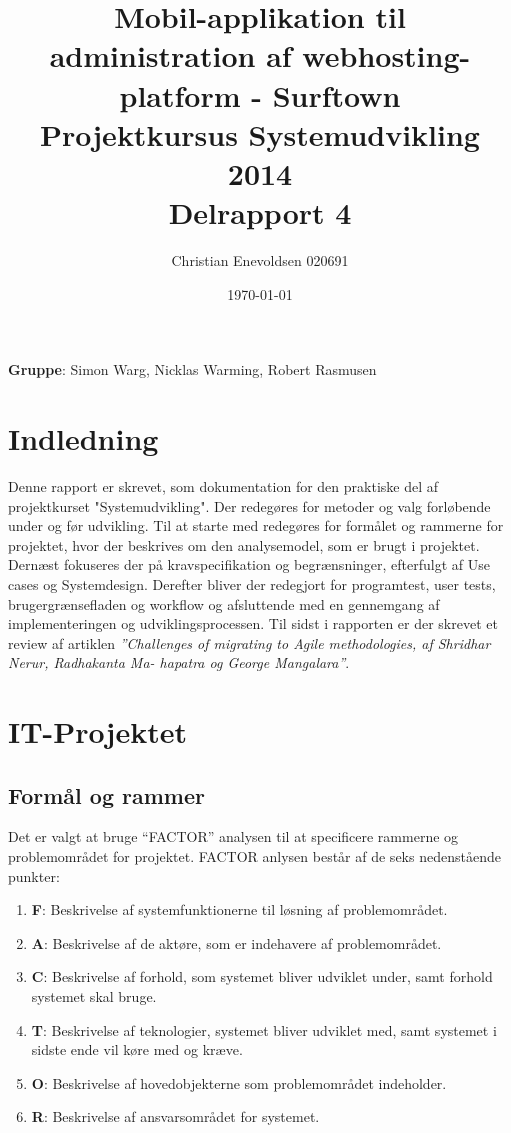 \documentclass[12pt]{article}
\title{Mobil-applikation til administration af webhosting-platform - Surftown\\Projektkursus Systemudvikling 2014\\Delrapport 4}
\date{\today}
\author{Christian Enevoldsen 020691}
\begin{document}
\maketitle
\begin{center}
  \textbf{Gruppe}: Simon Warg, Nicklas Warming, Robert Rasmusen
\end{center}
\newpage
\tableofcontents
\newpage
\section*{Indledning}

Denne rapport er skrevet, som dokumentation for den praktiske del af projektkurset "Systemudvikling". Der redegøres for metoder og valg forløbende under og før udvikling. Til at starte med redegøres for formålet og rammerne for projektet, hvor der beskrives om den analysemodel, som er brugt i projektet. Dernæst fokuseres der på kravspecifikation og begrænsninger, efterfulgt af Use cases og Systemdesign. Derefter bliver der redegjort for programtest, user tests, brugergrænsefladen og workflow og afsluttende med en gennemgang af implementeringen og udviklingsprocessen. Til sidst i rapporten er der skrevet et review af artiklen \emph{''Challenges of migrating to Agile methodologies, af Shridhar Nerur, Radhakanta Ma- hapatra og George Mangalara''}. 

\section {IT-Projektet}

\subsection{Formål og rammer}

Det er valgt at bruge ``FACTOR'' \cite{factor} analysen til at specificere rammerne og problemområdet for projektet.
FACTOR anlysen består af de seks nedenstående punkter:
\begin{enumerate}
	\item{\textbf{F}: Beskrivelse af systemfunktionerne til løsning af problemområdet.}	
	\item{\textbf{A}: Beskrivelse af de aktøre, som er indehavere af problemområdet.}
	\item{\textbf{C}: Beskrivelse af forhold, som systemet bliver udviklet under, samt forhold systemet skal bruge. }
	\item{\textbf{T}: Beskrivelse af teknologier, systemet bliver udviklet med, samt systemet i sidste ende vil køre med og kræve.}
	\item{\textbf{O}: Beskrivelse af hovedobjekterne som problemområdet indeholder.}
	\item{\textbf{R}: Beskrivelse af ansvarsområdet for systemet.}

\end{enumerate}
\end{document}
